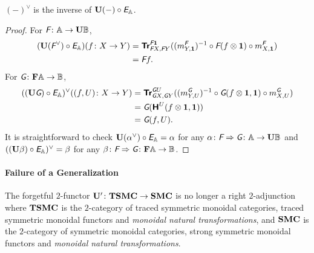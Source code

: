 \begin{proposition}
  $(-)^{\vee}$ is the inverse of $\mathbf{U}(-) \circ \textit{\textsf{E}}_{\mathbb{A}}$.
\end{proposition}
\begin{proof}
  For $\textit{\textsf{F}} \colon \mathbb{A} \to \mathbf{U}\mathbb{B}$,
  \begin{align*}
    (\mathbf{U} (\textit{\textsf{F}}^{\vee}) \circ \textit{\textsf{E}}_{\mathbb{A}})(f \colon X \to Y)
    &= {\normalfont\textsf{\textbf{Tr}}}^{\textit{\textsf{F}}\mathbf 1}_{\textit{\textsf{F}}X,\textit{\textsf{F}}Y} ((m^{\textit{\textsf{F}}}_{Y,\mathbf 1})^{-1} \circ
    \textit{\textsf{F}}(f \otimes \mathbf 1) \circ m^{\textit{\textsf{F}}}_{X,\mathbf 1}) \\
    &= \textit{\textsf{F}}f.
  \end{align*}
  For $\textit{\textsf{G}} \colon \mathbf{F}\mathbb{A} \to \mathbb{B}$,
  \begin{align*}
    ((\mathbf{U} \textit{\textsf{G}}) \circ \textit{\textsf{E}}_{\mathbb{A}})^{\vee}((f,U) \colon X \to Y)
    &= {\normalfont\textsf{\textbf{Tr}}}^{\textit{\textsf{G}}U}_{\textit{\textsf{G}}X,\textit{\textsf{G}}Y}((m^{\textit{\textsf{G}}}_{Y,U})^{-1}
    \circ \textit{\textsf{G}}(f \otimes \mathbf 1,\mathbf 1) \circ m^{\textit{\textsf{G}}}_{X,U}) \\
    &= \textit{\textsf{G}}({\normalfont\textsf{\textbf{H}}^{U}}(f \otimes \mathbf 1,\mathbf 1)) \\
    &= \textit{\textsf{G}}(f,U).
  \end{align*}
  It is straightforward to check
  $\mathbf{U} (\alpha^{\vee}) \circ \textit{\textsf{E}}_{\mathbb{A}} = \alpha$ for any $\alpha
  \colon \textit{\textsf{F}} \Rightarrow \textit{\textsf{G}} \colon \mathbb{A} \to
  \mathbf{U}\mathbb{B}$ and $((\mathbf{U} \beta) \circ \textit{\textsf{E}}_{\mathbb{A}})^{\vee} = \beta$ for
  any $\beta \colon \textit{\textsf{F}} \Rightarrow \textit{\textsf{G}} \colon \mathbf{F}\mathbb{A} \to \mathbb{B}$.
\end{proof}

\paragraph{Failure of a Generalization}

The forgetful $2$-functor $\mathbf{U}' \colon \mathbf{TSMC} \to \mathbf{SMC}$ is no longer
a right $2$-adjunction where $\mathbf{TSMC}$ is the $2$-category of traced
symmetric monoidal categories, traced symmetric monoidal functors and
\emph{monoidal natural transformations}, and $\mathbf{SMC}$ is the
$2$-category of symmetric monoidal categories, strong symmetric
monoidal functors and \emph{monoidal natural transformations}.

